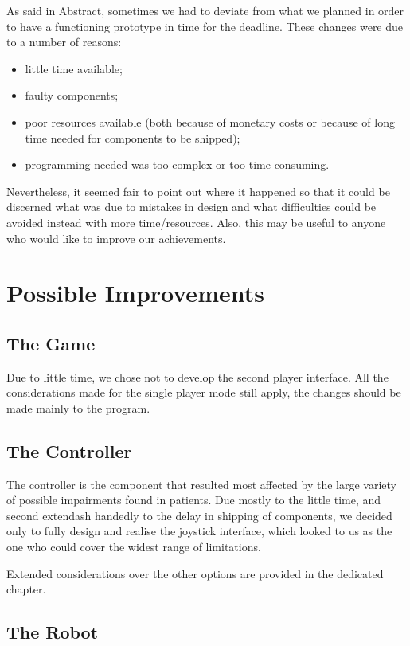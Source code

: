 \documentclass[a4paper,twoside]{book}
\begin{document}
\beforelist* As said in Abstract, sometimes we had to deviate from what we planned in order to have a functioning prototype in time for the deadline. These changes were due to a number of reasons:
\begin{itemize}
\item little time available;
\item faulty components;
\item poor resources available (both because of monetary costs or because of long time needed for components to be shipped);
\item programming needed was too complex or too time-consuming.
\end{itemize}
\afterlist
Nevertheless, it seemed fair to point out where it happened so that it could be discerned what was due to mistakes in design and what difficulties could be avoided instead with more time/resources. Also, this may be useful to anyone who would like to improve our achievements.

\section{Possible Improvements}

\subsection*{The Game}

Due to little time, we chose not to develop the second player interface. All the considerations made for the single player mode still apply, the changes should be made mainly to the program.

\subsection*{The Controller}

The controller is the component that resulted most affected by the large variety of possible impairments found in patients. Due mostly to the little time, and second extendash handedly to the delay in shipping of components, we decided only to fully design and realise the joystick interface, which looked to us as the one who could cover the widest range of limitations.

Extended considerations over the other options are provided in the dedicated chapter.

\subsection*{The Robot}
\end{document}
